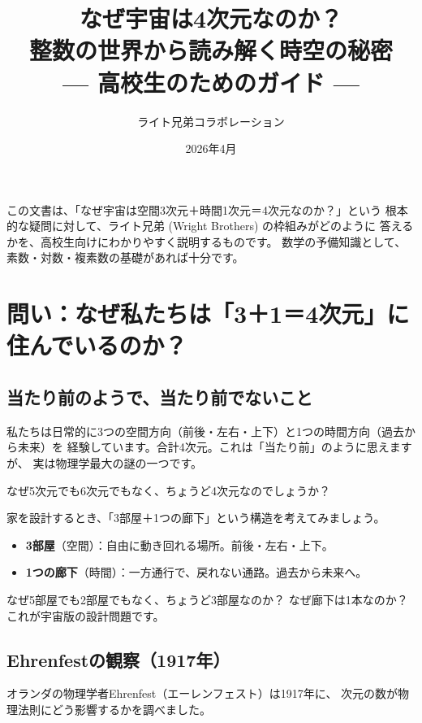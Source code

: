 \documentclass[12pt,a4paper]{article}
\title{\textbf{なぜ宇宙は4次元なのか？}\\
{\Large 整数の世界から読み解く時空の秘密}\\[0.5em]
{\normalsize --- 高校生のためのガイド ---}}
\author{ライト兄弟コラボレーション}
\date{2026年4月}
\begin{document}
\maketitle

\begin{keypoint}[この文書について]
この文書は、「なぜ宇宙は空間3次元＋時間1次元＝4次元なのか？」という
根本的な疑問に対して、ライト兄弟 (Wright Brothers) の枠組みがどのように
答えるかを、高校生向けにわかりやすく説明するものです。
数学の予備知識として、素数・対数・複素数の基礎があれば十分です。
\end{keypoint}

\tableofcontents
\newpage

\section{問い：なぜ私たちは「3＋1＝4次元」に住んでいるのか？}

\subsection{当たり前のようで、当たり前でないこと}

私たちは日常的に3つの空間方向（前後・左右・上下）と1つの時間方向（過去から未来）を
経験しています。合計4次元。これは「当たり前」のように思えますが、
実は物理学最大の謎の一つです。

なぜ5次元でも6次元でもなく、ちょうど4次元なのでしょうか？

\begin{analogy}[家のアナロジー]
家を設計するとき、「3部屋＋1つの廊下」という構造を考えてみましょう。
\begin{itemize}
  \item \textbf{3部屋}（空間）：自由に動き回れる場所。前後・左右・上下。
  \item \textbf{1つの廊下}（時間）：一方通行で、戻れない通路。過去から未来へ。
\end{itemize}
なぜ5部屋でも2部屋でもなく、ちょうど3部屋なのか？
なぜ廊下は1本なのか？ これが宇宙版の設計問題です。
\end{analogy}

\subsection{Ehrenfestの観察（1917年）}

オランダの物理学者Ehrenfest（エーレンフェスト）は1917年に、
次元の数が物理法則にどう影響するかを調べました。
\end{document}
